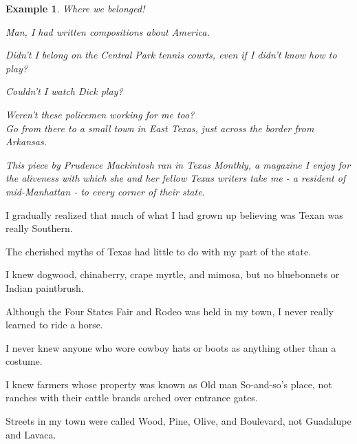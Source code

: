 \documentclass{book}
\numberwithin{equation}{section}
\newtheorem{example}{Example}[chapter]
\begin{document}
\begin{example}
    Where we belonged!
    
    Man, I had written compositions about America.
    
    Didn't I belong on the Central Park tennis courts, even if I didn't know how to play?
    
    Couldn't I watch Dick play?
    
    Weren't these policemen working for me too?
    \\
    
    Go from there to a small town in East Texas, just across the border from Arkansas.
    
    This piece by Prudence Mackintosh ran in \textit{Texas Monthly}, a magazine I enjoy for the aliveness with which she and her fellow Texas writers take me - a resident of mid-Manhattan - to every corner of their state.
\end{example}
I gradually realized that much of what I had grown up believing was Texan was really Southern.

The cherished myths of Texas had little to do with my part of the state.

I knew dogwood, chinaberry, crape myrtle, and mimosa, but no bluebonnets or Indian paintbrush.

Although the Four States Fair and Rodeo was held in my town, I never really learned to ride a horse.

I never knew anyone who wore cowboy hats or boots as anything other than a costume.

I knew farmers whose property was known as Old man So-and-so's place, not ranches with their cattle brands arched over entrance gates.

Streets in my town were called Wood, Pine, Olive, and Boulevard, not Guadalupe and Lavaca.
\end{document}
